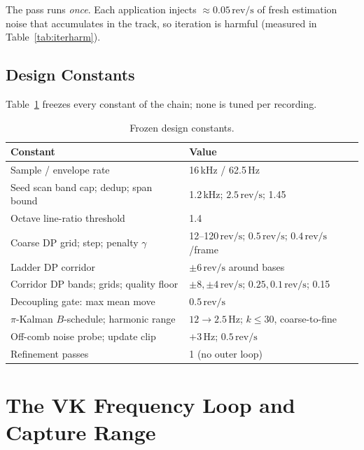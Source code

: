 \documentclass[journal]{IEEEtran}
\newcommand{\revps}{\ensuremath{\,\mathrm{rev/s}}}
\begin{document}
The pass runs \emph{once}. Each application injects ${\approx}0.05\revps$
of fresh estimation noise that accumulates in the track, so iteration is
harmful (measured in Table~\ref{tab:iterharm}).

\subsection{Design Constants}
\label{sec:constants}

Table~\ref{tab:constants} freezes every constant of the chain; none is
tuned per recording.

\begin{table}[t]
  \centering
  \caption{Frozen design constants.}
  \label{tab:constants}
  \scriptsize
  \setlength{\tabcolsep}{4pt}
  \begin{tabular}{@{}ll@{}}
    \toprule
    Constant & Value \\
    \midrule
    Sample / envelope rate & 16\,kHz / 62.5\,Hz \\
    Seed scan band cap; dedup; span bound & 1.2\,kHz; $2.5\revps$; 1.45 \\
    Octave line-ratio threshold & 1.4 \\
    Coarse DP grid; step; penalty $\gamma$
      & 12--120\revps; $0.5\revps$; $0.4\revps$/frame \\
    Ladder DP corridor & $\pm6\revps$ around bases \\
    Corridor DP bands; grids; quality floor
      & $\pm8, \pm4\revps$; $0.25, 0.1\revps$; 0.15 \\
    Decoupling gate: max mean move & $0.5\revps$ \\
    $\pi$-Kalman $B$-schedule; harmonic range & $12 \to 2.5$\,Hz;
      $k \le 30$, coarse-to-fine \\
    Off-comb noise probe; update clip & $+3$\,Hz; $0.5\revps$ \\
    Refinement passes & 1 (no outer loop) \\
    \bottomrule
  \end{tabular}
\end{table}

\section{The VK Frequency Loop and Capture Range}
\label{sec:vkloop}
\end{document}
